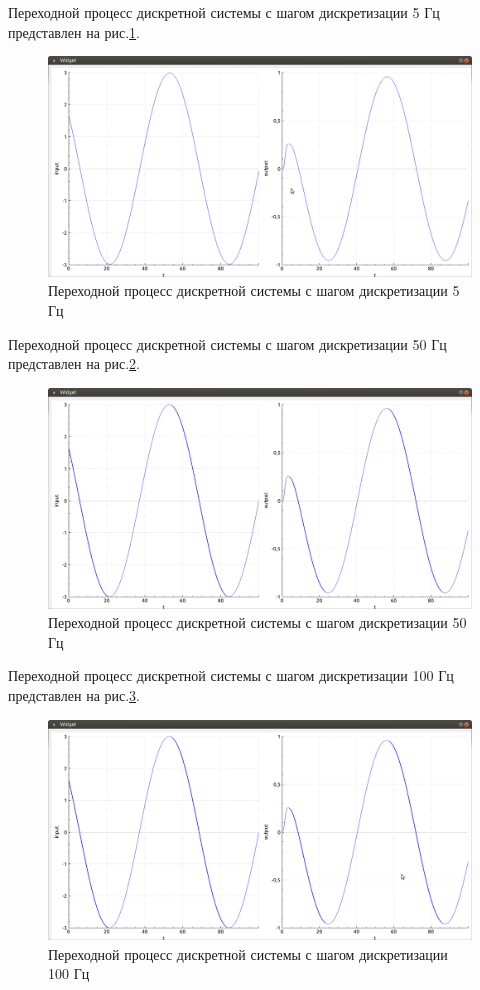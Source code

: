 \documentclass[14pt,a4paper]{extreport}
\begin{document}
Переходной процесс дискретной системы с шагом дискретизации 
5 Гц представлен на рис.\ref{fig:discrete5}.
\begin{figure}[H]
    \centering
    \includegraphics[width=160mm]{img/5hz.png}
    \caption{Переходной процесс дискретной системы 
    с шагом дискретизации 5 Гц}
    \label{fig:discrete5}
\end{figure}

Переходной процесс дискретной системы с шагом дискретизации 
50 Гц представлен на рис.\ref{fig:discrete50}.

\begin{figure}[H]
    \centering
    \includegraphics[width=160mm]{img/50hz.png}
    \caption{Переходной процесс дискретной системы 
    с шагом дискретизации 50 Гц}
    \label{fig:discrete50}
\end{figure}

Переходной процесс дискретной системы с шагом дискретизации 
100 Гц представлен на рис.\ref{fig:discrete100}.

\begin{figure}[H]
    \centering
    \includegraphics[width=160mm]{img/100hz.png}
    \caption{Переходной процесс дискретной системы 
    с шагом дискретизации 100 Гц}
    \label{fig:discrete100}
\end{figure}
\end{document}
